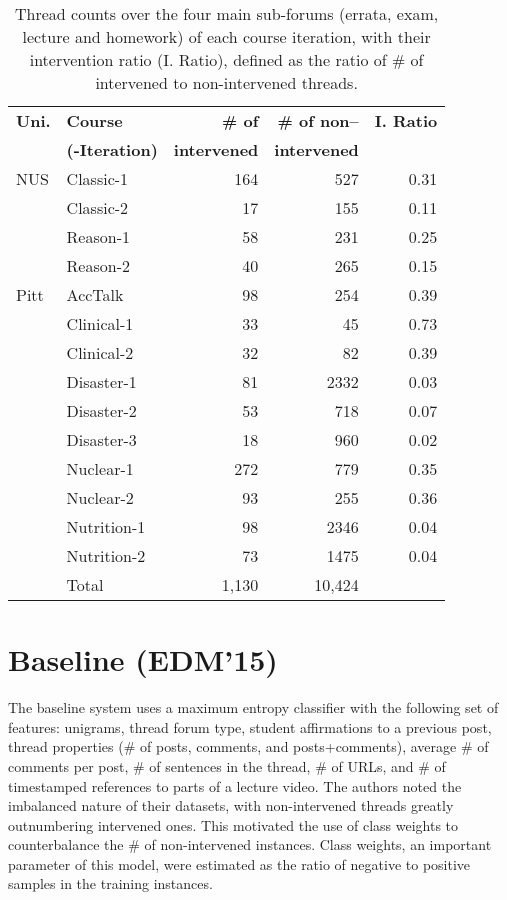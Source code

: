 \documentclass[letterpaper]{article}
\begin{document}
\begin{table}
\centering
\def\arraystretch{1.2}%
\small
\begin{tabular}{|l|l|r|r|r|}
\hline 
\bf Uni. & \bf Course & \bf \# of  & \bf  \# of non--  & \bf I. Ratio \\ 
\bf &\bf (-Iteration) & \bf 	intervened	 & \bf intervened & \bf \\ 
\hline
NUS & {\sc Classic-1} & 164 & 527 & 0.31\\
& {\sc Classic-2 } & 17 & 155 & 0.11\\
& {\sc Reason-1 } & 58 & 231 & 0.25\\
& {\sc Reason-2 } & 40 & 265 & 0.15\\
\hline
Pitt & {\sc AccTalk} & 98& 254& 0.39\\
& {\sc Clinical-1} & 33& 45& 0.73\\
& {\sc Clinical-2} & 32& 82& 0.39\\
& {\sc Disaster-1} & 81& 2332& 0.03\\
& {\sc Disaster-2} & 53& 718& 0.07\\
& {\sc Disaster-3} & 18& 960& 0.02\\
& {\sc Nuclear-1} & 272& 779& 0.35\\
& {\sc Nuclear-2} & 93&255& 0.36\\
& {\sc Nutrition-1} & 98& 2346& 0.04\\
& {\sc Nutrition-2} & 73& 1475& 0.04\\
\hline
 & Total & 1,130& 10,424& \\
\hline
\end{tabular}
\caption{\label{tab:data} Thread counts over the four main sub-forums  (errata, 
exam, lecture and homework) of each course iteration, with their intervention 
ratio (I. Ratio), defined as the ratio of \# of intervened to non-intervened 
threads.}
\end{table} 


\section{Baseline (EDM'15)}
\label{sect:baseline}
The baseline system uses a maximum entropy classifier with the
following set of features: unigrams, thread forum type, student
affirmations to a previous post, thread properties (\# of posts,
comments, and posts+comments), average \# of comments per post, \# of
sentences in the thread, \# of URLs, and \# of timestamped references
to parts of a lecture video. The authors noted the imbalanced nature
of their datasets, with non-intervened threads greatly outnumbering
intervened ones. This motivated the use of class weights to
counterbalance the \# of non-intervened instances. Class weights, an
important parameter of this model, were estimated as the ratio of
negative to positive samples in the training instances.
\end{document}
